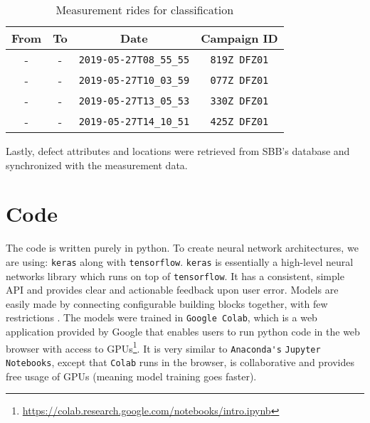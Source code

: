 \begin{table}[H]
	\centering
	\begin{tabular}{|c|c|c|c|} \hline
		\textbf{From} & \textbf{To} & \textbf{Date} & \textbf{Campaign ID}\\ \hline \hline 
		- & - &  \verb|2019-05-27T08_55_55| & \verb|819Z DFZ01| \\ \hline 
		- & - &  \verb|2019-05-27T10_03_59| & \verb|077Z DFZ01| \\ \hline 
		- & - &  \verb|2019-05-27T13_05_53| & \verb|330Z DFZ01| \\ \hline 
		- & - &  \verb|2019-05-27T14_10_51| & \verb|425Z DFZ01| \\ \hline 

	\end{tabular}
	\caption{Measurement rides for classification}
	\label{tab:rides}
\end{table}

Lastly, defect attributes and locations were retrieved from SBB's database and synchronized with the measurement data.

\section{Code}
\label{int:sec:code}
The code is written purely in python. To create neural network architectures, we are using: \verb|keras| along with \verb|tensorflow|. \verb|keras| is essentially a high-level neural networks library which runs on top of \verb|tensorflow|. It has a consistent, simple API and provides clear and actionable feedback upon user error. Models are easily made by connecting configurable building blocks together, with few restrictions \cite{TensorFl31:online}. The models were trained in \verb|Google Colab|, which is a web application provided by Google that enables users to run python code in the web browser with access to GPUs\footnote{\url{https://colab.research.google.com/notebooks/intro.ipynb}}. It is very similar to \verb|Anaconda's| \verb|Jupyter Notebooks|, except that \verb|Colab| runs in the browser, is collaborative and provides free usage of GPUs (meaning model training goes faster).\\


